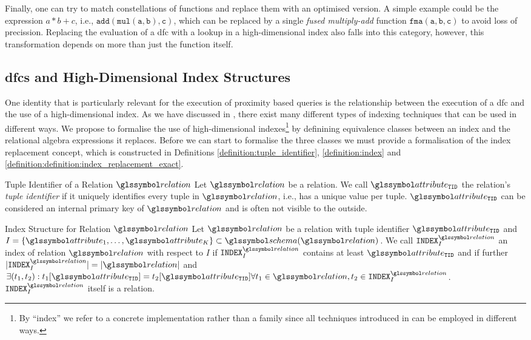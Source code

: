 Finally, one can try to match constellations of functions and replace them with an optimised version. A simple example could be the expression $a * b + c$, i.e., $\mathtt{add}(\mathtt{mul}(\mathtt{a},\mathtt{b}), \mathtt{c})$, which can be replaced by a single \emph{fused multiply-add} function $\mathtt{fma}(\mathtt{a},\mathtt{b},\mathtt{c})$ to avoid loss of precission. Replacing the evaluation of a \acrshort{dfc} with a lookup in a high-dimensional index also falls into this category, however, this transformation depends on more than just the function itself.

\subsection{\texorpdfstring{\acrshort{dfc}s}{DFCs} and High-Dimensional Index Structures}

One identity that is particularly relevant for the execution of proximity based queries is the relationship between the execution of a \acrshort{dfc} and the use of a high-dimensional index. As we have discussed in , there exist many different types of indexing techniques that can be used in different ways. We propose to formalise the use of high-dimensional indexes\footnote{By ``index'' we refer to a concrete implementation rather than a family since all techniques introduced in  can be employed in different ways.} by definining equivalence classes between  an index and the relational algebra expressions it replaces. Before we can start to formalise the three classes we must provide a formalisation of the index replacement concept, which is constructed in Definitions \ref{definition:tuple_identifier}, \ref{definition:index} and \ref{definition:definition:index_replacement_exact}.

\begin{definition}[label=definition:tuple_identifier]{Tuple Identifier of a Relation $\relation$}{}
    Let $\relation$ be a relation. We call $\attribute_{\mathtt{TID}}$ the relation's \emph{tuple identifier} if it uniquely identifies every tuple in $\relation$, i.e., has a unique value per tuple. $\attribute_{\mathtt{TID}}$ can be considered an internal primary key of $\relation$ and is often not visible to the outside.
\end{definition}

\begin{definition}[label=definition:index]{Index Structure for Relation $\relation$}{}
    Let $\relation$ be a relation with tuple identifier $\attribute_{\mathtt{TID}}$ and $I = \{ \attribute_{1}, \ldots, \attribute_{K} \} \subset \schema (\relation)$. We call $\mathtt{INDEX}^{\relation}_I$ an index of relation $\relation$ with respect to $I$ if $\mathtt{INDEX}^{\relation}_I$ contains at least $\attribute_{\mathtt{TID}}$ and if further $|\mathtt{INDEX}^{\relation}_I| = |\relation|$ and $\exists (t_1, t_2) : t_1[\attribute_{\mathtt{TID}}] = t_2[\attribute_{\mathtt{TID}}] \forall t_1 \in \relation, t_2 \in \mathtt{INDEX}^{\relation}_I$. $\mathtt{INDEX}^{\relation}_I$ itself is a relation.
\end{definition}

